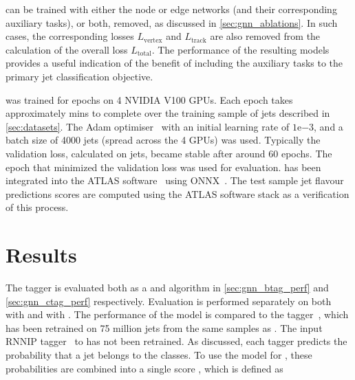 \GNN can be trained with either the node or edge networks (and their corresponding auxiliary tasks), or both, removed, as discussed in \cref{sec:gnn_ablations}.
In such cases, the corresponding losses $L_\text{vertex}$ and $L_\text{track}$ are also removed from the calculation of the overall loss $L_\text{total}$. 
The performance of the resulting models provides a useful indication of the benefit of including the auxiliary tasks to the primary jet classification objective.

\GNN was trained for \nepochs epochs on 4 NVIDIA V100 GPUs.
Each epoch takes approximately \minsperepoch mins to complete over the training sample of \njetstrain jets described in \cref{sec:datasets}.
The Adam optimiser~\cite{arxiv.1412.6980} with an initial learning rate of $1\mathrm{e}{-3}$, and a batch size of 4000 jets (spread across the 4 GPUs) was used.
Typically the validation loss, calculated on \njetsval jets, became stable after around 60 epochs.
The epoch that minimized the validation loss was used for evaluation.
\GNN has been integrated into the ATLAS software~\cite{ATL-SOFT-PUB-2021-001} using ONNX~\cite{bai2019}.
The test sample jet flavour predictions scores are computed using the ATLAS software stack as a verification of this process.


\section{Results}\label{sec:gnn_results}


The \GNN tagger is evaluated both as a \btag and \ctag algorithm in \cref{sec:gnn_btag_perf} and \cref{sec:gnn_ctag_perf} respectively.
Evaluation is performed separately on both \ttbarjets with \ttbarpt and \Zprimejets with \Zprimept.
The performance of the model is compared to the \DLr tagger~\cite{ATL-PHYS-PUB-2017-013,ATLAS:2022qxm}, which has been retrained on 75 million jets from the same samples as \GNN.
The input RNNIP tagger~\cite{ATL-PHYS-PUB-2017-003} to \DLr has not been retrained.
As discussed, each tagger predicts the probability that a jet belongs to the \bcl classes.
To use the model for \btag, these probabilities are combined into a single score \Db, which is defined as

